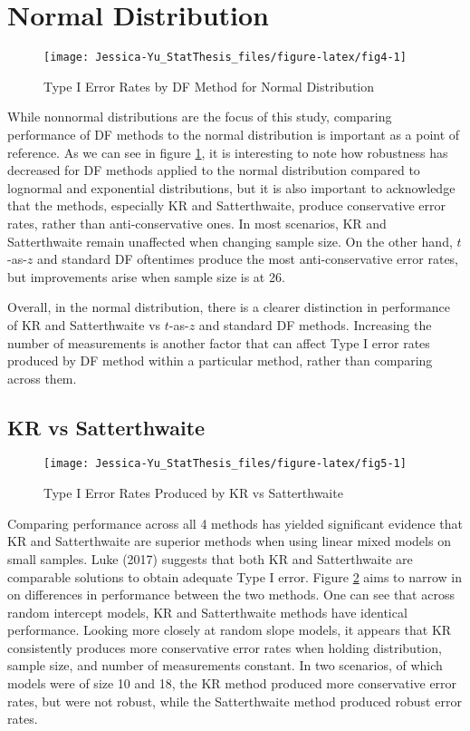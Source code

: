 \documentclass[12pt, twoside]{amherstthesis}
\begin{document}
\hypertarget{normal-distribution}{%
\section{Normal Distribution}\label{normal-distribution}}
\begin{figure}

{\centering \texttt{[image: Jessica-Yu\_StatThesis\_files/figure-latex/fig4-1]} 

}

\caption{Type I Error Rates by DF Method for Normal Distribution}\label{fig:fig4}
\end{figure}
While nonnormal distributions are the focus of this study, comparing performance of DF methods to the normal distribution is important as a point of reference. As we can see in figure \ref{fig:fig4}, it is interesting to note how robustness has decreased for DF methods applied to the normal distribution compared to lognormal and exponential distributions, but it is also important to acknowledge that the methods, especially KR and Satterthwaite, produce conservative error rates, rather than anti-conservative ones. In most scenarios, KR and Satterthwaite remain unaffected when changing sample size. On the other hand, \(t\)-as-\(z\) and standard DF oftentimes produce the most anti-conservative error rates, but improvements arise when sample size is at 26.

Overall, in the normal distribution, there is a clearer distinction in performance of KR and Satterthwaite vs \(t\)-as-\(z\) and standard DF methods. Increasing the number of measurements is another factor that can affect Type I error rates produced by DF method within a particular method, rather than comparing across them.

\hypertarget{kr-vs-satterthwaite}{%
\subsection{KR vs Satterthwaite}\label{kr-vs-satterthwaite}}
\begin{figure}

{\centering \texttt{[image: Jessica-Yu\_StatThesis\_files/figure-latex/fig5-1]} 

}

\caption{Type I Error Rates Produced by KR vs Satterthwaite}\label{fig:fig5}
\end{figure}
Comparing performance across all 4 methods has yielded significant evidence that KR and Satterthwaite are superior methods when using linear mixed models on small samples. Luke (2017) suggests that both KR and Satterthwaite are comparable solutions to obtain adequate Type I error. Figure \ref{fig:fig5} aims to narrow in on differences in performance between the two methods. One can see that across random intercept models, KR and Satterthwaite methods have identical performance. Looking more closely at random slope models, it appears that KR consistently produces more conservative error rates when holding distribution, sample size, and number of measurements constant. In two scenarios, of which models were of size 10 and 18, the KR method produced more conservative error rates, but were not robust, while the Satterthwaite method produced robust error rates.
\end{document}
